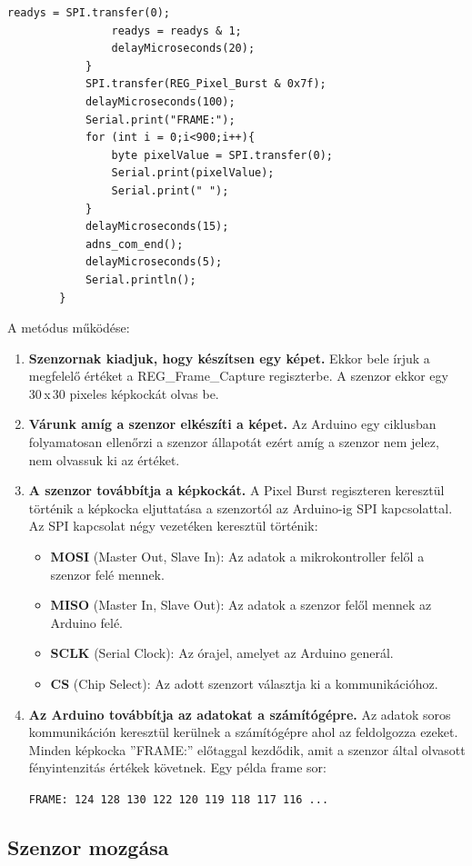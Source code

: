 \documentclass[]{thesis-ekf}
\theoremstyle{definition}
\theoremstyle{remark}
\begin{document}
\begin{enumerate}
\begin{lstlisting}[language=Arduino,label=sendFrame]
				readys = SPI.transfer(0); 
				readys = readys & 1;
				delayMicroseconds(20);
			}
			SPI.transfer(REG_Pixel_Burst & 0x7f); 
			delayMicroseconds(100); 
			Serial.print("FRAME:");
			for (int i = 0;i<900;i++){
				byte pixelValue = SPI.transfer(0);  
				Serial.print(pixelValue);
				Serial.print(" ");
			}
			delayMicroseconds(15); 
			adns_com_end();  
			delayMicroseconds(5); 
			Serial.println();
		}
	\end{lstlisting}
	A metódus működése:
	\begin{enumerate}[label=\arabic*.]
		\item \textbf{Szenzornak kiadjuk, hogy készítsen egy képet.} Ekkor bele írjuk a megfelelő értéket a REG\_Frame\_Capture regiszterbe. A szenzor ekkor egy 30\,x\,30 pixeles képkockát olvas be.
		\item \textbf{Várunk amíg a szenzor elkészíti a képet.} Az Arduino egy ciklusban folyamatosan ellenőrzi a szenzor állapotát ezért amíg a szenzor nem jelez, nem olvassuk ki az értéket.
		\item \textbf{A szenzor továbbítja a képkockát.} A Pixel Burst regiszteren keresztül történik a képkocka eljuttatása a szenzortól az Arduino-ig SPI kapcsolattal. Az SPI kapcsolat négy vezetéken keresztül történik:
		\begin{itemize}
			\item \textbf{MOSI }(Master Out, Slave In): Az adatok a mikrokontroller felől a szenzor felé mennek.
			\item \textbf{MISO }(Master In, Slave Out): Az adatok a szenzor felől mennek az Arduino felé.
			\item \textbf{SCLK }(Serial Clock): Az órajel, amelyet az Arduino generál.
			\item \textbf{CS }(Chip Select): Az adott szenzort választja ki a kommunikációhoz.
		\end{itemize}
		\item \textbf{Az Arduino továbbítja az adatokat a számítógépre.} Az adatok soros kommunikáción keresztül kerülnek a számítógépre ahol az feldolgozza ezeket. Minden képkocka ''FRAME:'' előtaggal kezdődik, amit a szenzor által olvasott fényintenzitás értékek követnek. Egy példa frame sor:
		
		\verb|FRAME: 124 128 130 122 120 119 118 117 116 ...|
	\end{enumerate}
\end{enumerate}
\subsection{Szenzor mozgása}
\end{document}
